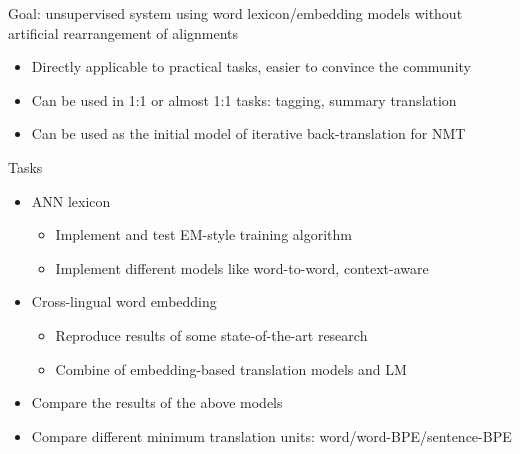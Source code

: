 \documentclass[11pt, a4paper, landscape]{article}
\begin{document}
	\NewPage
	Goal: unsupervised system using word lexicon/embedding models without artificial rearrangement of alignments
	\begin{itemize}
		\item Directly applicable to practical tasks, easier to convince the community
		\item Can be used in 1:1 or almost 1:1 tasks: tagging, summary translation
		\item Can be used as the initial model of iterative back-translation for NMT\\
	\end{itemize}
	Tasks
	\begin{itemize}
		\item 	ANN lexicon
		\begin{itemize}
			\item Implement and test EM-style training algorithm
			\item Implement different models like word-to-word, context-aware
		\end{itemize}
		
		\item Cross-lingual word embedding
		\begin{itemize}
			\item Reproduce results of some state-of-the-art research
			\item Combine of embedding-based translation models and LM
		\end{itemize}
		\item Compare the results of  the above models
		\item Compare different minimum translation units: word/word-BPE/sentence-BPE
		
	\end{itemize}
	
	
	
	
	\NewPage
	
\end{document}
